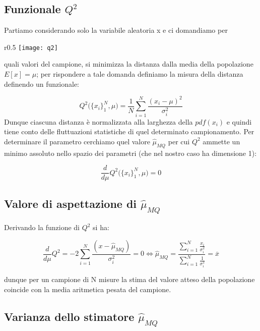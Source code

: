 \subsection{Funzionale $Q^2$}

\noindent Partiamo considerando solo la variabile aleatoria x  e ci domandiamo per 
\begin{wrapfigure}{r}{0.5 \textwidth}
\vspace{-10pt}
\centering
\texttt{[image: q2]}	
\end{wrapfigure}
quali valori del campione, si minimizza la distanza dalla media della popolazione $E[x] = \mu$; per rispondere a tale domanda definiamo la misura della distanza definendo un funzionale:
\newline

\begin{equation}
	Q^2\Big(\{x_i\}_1^N,\mu \Big) = \dfrac{1}{N}\sum_{i=1}^N\dfrac{(x_i - \mu)^2}{\sigma_i^2}
\end{equation}
\newline
Dunque ciascuna distanza \`{e} normalizzata alla larghezza della $pdf(x_i)$ e quindi tiene conto delle fluttuazioni statistiche di quel determinato campionamento.\newline
 Per determinare il  parametro cerchiamo quel valore $\hat{\mu}_{MQ}$ per cui $Q^2$ ammette un minimo assoluto nello spazio dei parametri (che nel nostro caso ha dimensione 1):

\begin{equation}
	\dfrac{d}{d\mu}Q^2 \Big(\{x_i\}_1^N, \mu \Big) = 0
\end{equation}
 

\subsection{Valore di aspettazione di $\hat{\mu}_{MQ}$}

Derivando la funzione di $Q^2$ si ha:

\begin{equation*}
	\dfrac{d}{d\mu}Q^2 = -2 \sum_{i=1}^N \dfrac{(x-\hat{\mu}_{MQ})}{\sigma_i^2} = 0 \iff  \hat{\mu}_{MQ} = \dfrac{\sum_{i=1}^N \frac{x_i}{\sigma_i^2}}{\sum_{i=1}^N \frac{1}{\sigma^2_i}}= \overline{x}
\end{equation*}

\noindent dunque per un campione di N misure la stima del valore atteso della popolazione coincide con la media aritmetica pesata del campione.

\subsection{Varianza dello stimatore $\hat{\mu}_{MQ}$}


